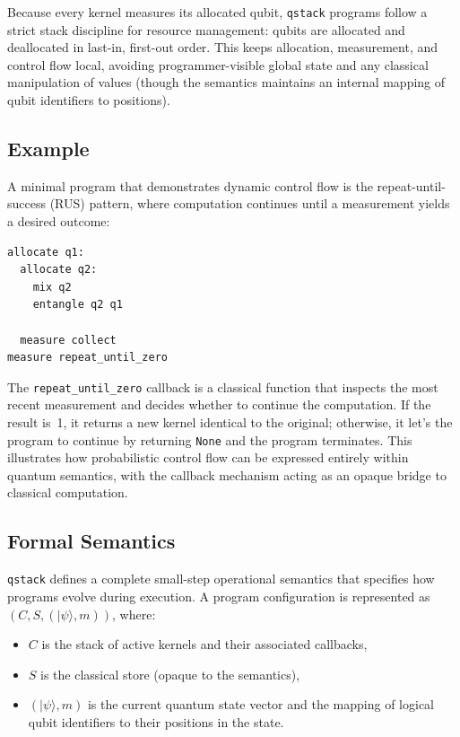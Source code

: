 Because every kernel measures its allocated qubit, \texttt{qstack} programs follow a strict stack discipline for resource management: qubits are allocated and deallocated in last-in, first-out order. 
This keeps allocation, measurement, and control flow local, avoiding programmer-visible global state and any classical manipulation of values (though the semantics maintains an internal mapping of qubit identifiers to positions).

\subsection{Example}

A minimal program that demonstrates dynamic control flow is the repeat-until-success (RUS) pattern, where computation continues until a measurement yields a desired outcome:

\begin{verbatim}
allocate q1:
  allocate q2:
    mix q2
    entangle q2 q1

  measure collect
measure repeat_until_zero
\end{verbatim}

The \texttt{repeat\_until\_zero} callback is a classical function that inspects the most recent measurement and decides whether to continue the computation. 
If the result is~1, it returns a new kernel identical to the original; otherwise, it let's the program to continue by returning \texttt{None} and the program terminates. 
This illustrates how probabilistic control flow can be expressed entirely within quantum semantics, with the callback mechanism acting as an opaque bridge to classical computation.


\subsection{Formal Semantics}

\texttt{qstack} defines a complete small-step operational semantics that specifies how programs evolve during execution. 
A program configuration is represented as $(C, S, (|\psi\rangle, m))$, where:
\begin{itemize}
    \item $C$ is the stack of active kernels and their associated callbacks,
    \item $S$ is the classical store (opaque to the semantics),
    \item $(|\psi\rangle, m)$ is the current quantum state vector and the mapping of logical qubit identifiers to their positions in the state.
\end{itemize}

